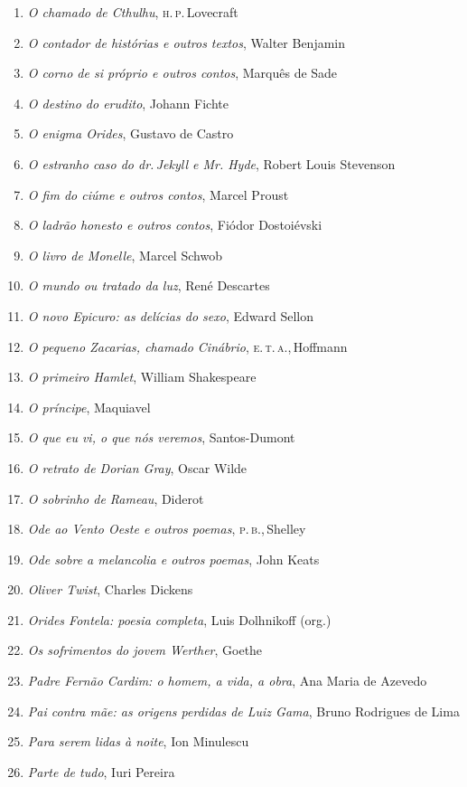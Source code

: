\begin{enumerate}
\item \textit{O chamado de Cthulhu}, \textsc{h.\,p.}\,Lovecraft
\item \textit{O contador de histórias e outros textos}, Walter Benjamin
\item \textit{O corno de si próprio e outros contos}, Marquês de Sade
\item \textit{O destino do erudito}, Johann Fichte
\item \textit{O enigma Orides}, Gustavo de Castro
\item \textit{O estranho caso do dr.\,Jekyll e Mr. Hyde}, Robert Louis Stevenson
\item \textit{O fim do ciúme e outros contos}, Marcel Proust
\item \textit{O ladrão honesto e outros contos}, Fiódor Dostoiévski
\item \textit{O livro de Monelle}, Marcel Schwob
\item \textit{O mundo ou tratado da luz}, René Descartes
\item \textit{O novo Epicuro: as delícias do sexo}, Edward Sellon
\item \textit{O pequeno Zacarias, chamado Cinábrio}, \textsc{e.\,t.\,a.},\,Hoffmann
\item \textit{O primeiro Hamlet}, William Shakespeare
\item \textit{O príncipe}, Maquiavel
\item \textit{O que eu vi, o que nós veremos}, Santos-Dumont
\item \textit{O retrato de Dorian Gray}, Oscar Wilde
\item \textit{O sobrinho de Rameau}, Diderot
\item \textit{Ode ao Vento Oeste e outros poemas}, \textsc{p.\,b.},\,Shelley
\item \textit{Ode sobre a melancolia e outros poemas}, John Keats
\item \textit{Oliver Twist}, Charles Dickens
\item \textit{Orides Fontela: poesia completa}, Luis Dolhnikoff (org.)
\item \textit{Os sofrimentos do jovem Werther}, Goethe
\item \textit{Padre Fernão Cardim: o homem, a vida, a obra}, Ana Maria de Azevedo
\item \textit{Pai contra mãe: as origens perdidas de Luiz Gama}, Bruno Rodrigues de Lima
\item \textit{Para serem lidas à noite}, Ion Minulescu
\item \textit{Parte de tudo}, Iuri Pereira

\end{enumerate}
